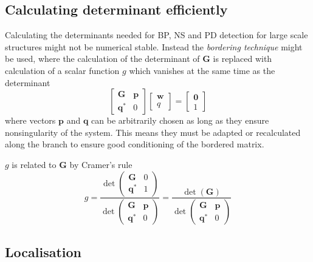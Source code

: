 \subsection{Calculating determinant efficiently}
\label{sec:bordering_tech}

Calculating the determinants needed for BP, NS and PD detection for large
scale structures might not be numerical stable. Instead the \textit{bordering
  technique} might be used, where the calculation of the determinant of $\bm G$
is replaced with calculation of a scalar function $g$ which vanishes at the same
time as the determinant \autocite{kuznetsov2013a}
\begin{equation}
  \begin{bmatrix}
    \bm G & \bm p \\
    \bm q^* & 0
  \end{bmatrix}
  \begin{bmatrix}
    \bm w \\ q
  \end{bmatrix}
  =
  \begin{bmatrix}
    \bm 0 \\ 1
  \end{bmatrix}
  \label{eq:bordered_system}
\end{equation}
where vectors $\bm p$ and $\bm q$ can be arbitrarily chosen as long as they
ensure nonsingularity of the system. This means they must be adapted or
recalculated along the branch to ensure good conditioning of the bordered
matrix.

$g$ is related to $\bm G$ by Cramer's rule
\begin{equation}
  g = \frac{\det
    \begin{pmatrix}
      \bm G & 0 \\
      \bm q^* & 1
    \end{pmatrix}}
  {\det
    \begin{pmatrix}
      \bm G & \bm p \\
      \bm q^* & 0
    \end{pmatrix}}
  =
  \frac{\det(\bm G)}
  {\det
    \begin{pmatrix}
      \bm G & \bm p \\
      \bm q^* & 0
    \end{pmatrix}}
\end{equation}


\subsection{Localisation}

